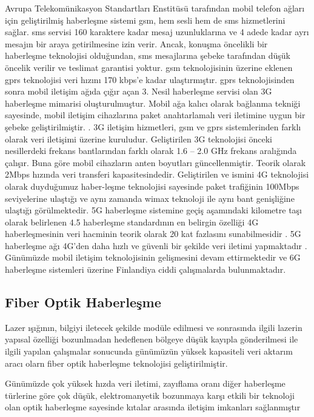Avrupa Telekomünikasyon Standartları Enstitüsü tarafından mobil telefon ağları için geliştirilmiş haberleşme sistemi \gls{gsm}, hem sesli hem de \gls{sms} hizmetlerini sağlar. \gls{sms} servisi 160 karaktere kadar mesaj uzunluklarına ve 4 adede kadar ayrı mesajın bir araya getirilmesine izin verir. Ancak, konuşma öncelikli bir haberleşme teknolojisi olduğundan, \gls{sms} mesajlarına şebeke tarafından düşük öncelik verilir ve teslimat garantisi yoktur. \gls{gsm} teknolojisinin üzerine eklenen \gls{gprs} teknolojisi veri hızını 170 kbps’e kadar ulaştırmıştır. \gls{gprs} teknolojisinden sonra mobil iletişim ağıda çığır açan 3. Nesil haberleşme servisi olan 3G haberleşme mimarisi oluşturulmuştur. Mobil ağa kalıcı olarak bağlanma tekniği sayesinde, mobil iletişim cihazlarına paket anahtarlamalı veri iletimine uygun bir şebeke geliştirilmiştir. \cite{smyth2003performance}. 3G iletişim hizmetleri, \gls{gsm} ve \gls{gprs} sistemlerinden farklı olarak veri iletişimi üzerine kuruludur. Geliştirilen 3G teknolojisi önceki nesillerdeki frekans bantlarından farklı olarak 1.6 -- 2.0 GHz frekans aralığında çalışır. Buna göre mobil cihazların anten boyutları güncellenmiştir. Teorik olarak 2Mbps hızında veri transferi kapasitesindedir. Geliştirilen ve ismini 4G teknolojisi olarak duyduğumuz haber-leşme teknolojisi sayesinde paket trafiğinin 100Mbps seviyelerine ulaştığı ve aynı zamanda \gls{wimax} teknoloji ile aynı bant genişliğine ulaştığı görülmektedir. 5G haberleşme sistemine geçiş aşamındaki kilometre taşı olarak belirlenen 4.5 haberleşme standardının en belirgin özelliği 4G haberleşmesinin veri hacminin teorik olarak 20 kat fazlasını sunabilmesidir \cite{routray20164}. 5G haberleşme ağı 4G’den daha hızlı ve güvenli bir şekilde veri iletimi yapmaktadır \cite{mishra2016mechanism}. Günümüzde mobil iletişim teknolojisinin gelişmesini devam ettirmektedir ve 6G haberleşme sistemleri üzerine Finlandiya ciddi çalışmalarda bulunmaktadır.

\subsection{Fiber Optik Haberleşme}

Lazer ışığının, bilgiyi iletecek şekilde modüle edilmesi ve sonrasında ilgili lazerin yapısal özelliği bozunlmadan hedeflenen bölgeye düşük kayıpla gönderilmesi ile ilgili yapılan çalışmalar sonucunda günümüzün yüksek kapasiteli veri aktarım aracı olarn fiber optik haberleşme teknolojisi geliştirilmiştir.

Günümüzde çok yüksek hızda veri iletimi, zayıflama oranı diğer haberleşme türlerine göre çok düşük, elektromanyetik bozunmaya karşı etkili bir teknoloji olan optik haberleşme sayesinde kıtalar arasında iletişim imkanları sağlanmıştır \cite{saleh2019fundamentals}

